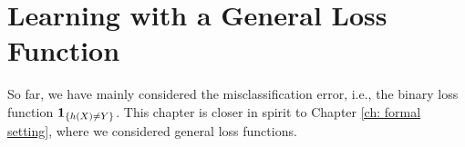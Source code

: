 \chapter{Learning with a General Loss Function}

So far, we have mainly considered the misclassification error, i.e., the binary loss function $\mathbf{1}_{\left\{h(X) \neq Y\right\}}$. This chapter is closer in spirit to Chapter \ref{ch: formal setting}, where we considered general loss functions.
